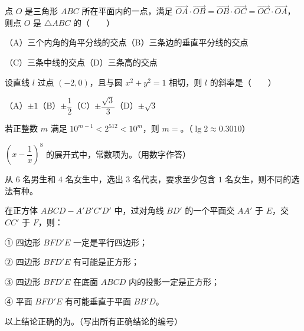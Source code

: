 \begin{question}
点 $O$ 是三角形 $ABC$ 所在平面内的一点，满足 $\overrightarrow{OA}\cdot\overrightarrow{OB}=\overrightarrow{OB}\cdot\overrightarrow{OC}=\overrightarrow{OC}\cdot\overrightarrow{OA}$，则点 $O$ 是 $\triangle ABC$ 的\mbox{（　　）}

（A）三个内角的角平分线的交点\quad（B）三条边的垂直平分线的交点

（C）三条中线的交点\quad（D）三条高的交点

\end{question}
\begin{question}
设直线 $l$ 过点 $(-2,0)$，且与圆 $x^2+y^2=1$ 相切，则 $l$ 的斜率是\mbox{（　　）}

（A）$\pm1$\quad（B）$\pm\dfrac12$\quad（C）$\pm\dfrac{\sqrt3}{3}$\quad（D）$\pm\sqrt3$

\end{question}

\begin{question}
若正整数 $m$ 满足 $10^{m-1}<2^{512}<10^m$，则 $m=$\gkblank{}。（$\lg2\approx0.3010$）

\end{question}
\begin{question}
$\left(x-\dfrac1x\right)^8$ 的展开式中，常数项为\gkblank{}。（用数字作答）

\end{question}
\begin{question}
从 $6$ 名男生和 $4$ 名女生中，选出 $3$ 名代表，要求至少包含 $1$ 名女生，则不同的选法有\gkblank{}种。

\end{question}
\begin{question}
在正方体 $ABCD-A'B'C'D'$ 中，过对角线 $BD'$ 的一个平面交 $AA'$ 于 $E$，交 $CC'$ 于 $F$，则：

① 四边形 $BFD'E$ 一定是平行四边形；

② 四边形 $BFD'E$ 有可能是正方形；

③ 四边形 $BFD'E$ 在底面 $ABCD$ 内的投影一定是正方形；

④ 平面 $BFD'E$ 有可能垂直于平面 $BB'D$。

以上结论正确的为\gkblank{}。（写出所有正确结论的编号）

\end{question}

